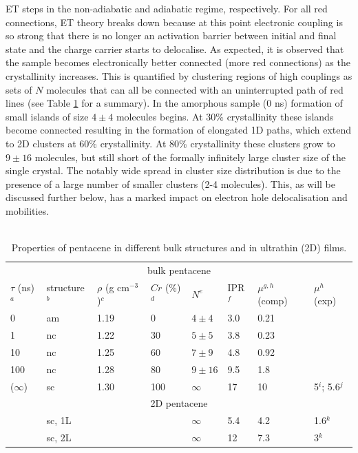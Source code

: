 ET steps in the non-adiabatic and adiabatic regime, respectively. For all red connections, ET theory breaks down because at this point electronic coupling is so strong 
that there is no longer an activation barrier between initial and final state and the charge carrier starts to delocalise\cite{C6FD00107F}. As expected, it is observed that  
the sample becomes electronically better connected (more red connections) as the crystallinity increases.  
This is quantified by clustering regions of high couplings as sets of $N$ molecules that can all be connected with an uninterrupted path of red lines (see Table \ref{tab:fragments} for a summary).
In the amorphous sample (0 ns) formation of small islands of size $4\pm4$ molecules begins. At 30\% crystallinity these islands become connected resulting in the formation of 
elongated 1D paths, which extend to 2D clusters at 60\% crystallinity. At 80\% crystallinity these clusters grow to $9\pm16$ molecules, but still short of the formally infinitely 
large cluster size of the single crystal. The notably wide spread in cluster size distribution is due to the presence of a large number of smaller clusters (2-4 molecules). 
This, as will be discussed further below, has a marked impact on electron hole delocalisation and mobilities. \\
\\
\begin{table}
 \caption{\label{tab:fragments}Properties of pentacene in different bulk structures and in ultrathin (2D) films.}
\begin{center}
  \begin{tabular}[htbp]{@{}llllllll@{}}
    \hline
     \multicolumn{8}{c}{bulk pentacene} \\
    $\tau$ (ns)$^a$ & structure$^b$ & $\rho$ (g cm$^{-3}$)$^c$ &  $Cr$ (\%)$^d$  &  $N^e$   & IPR$^f$  & $\mu^{g,h}$ (comp) & $\mu^h$ (exp) \\
    \hline
    0       & am & 1.19   & 0     & $4\pm4$      & 3.0 & 0.21 &       \\
    1       & nc & 1.22   & 30   & $5\pm5$      & 3.8	 & 0.23 &       \\
    10     & nc & 1.25   & 60   & $7\pm9$    & 4.8 & 0.92   &        \\
    100   & nc & 1.28  & 80   & $9\pm16$  & 9.5 & 1.8   &        \\
 ($\infty$) & sc &  1.30  & 100 & $\infty$           & 17 & 10 & 5$^i$; 5.6$^j$ \\
    \hline
    \multicolumn{8}{c}{2D pentacene} \\
             & sc, 1L &        &      &  $\infty$ &       5.4   &  4.2 & 1.6$^k$\\
             & sc, 2L &        &     &  $\infty$ &         12 & 7.3 & 3$^k$ \\
    \hline
  \end{tabular}
\end{center}
\end{table}

